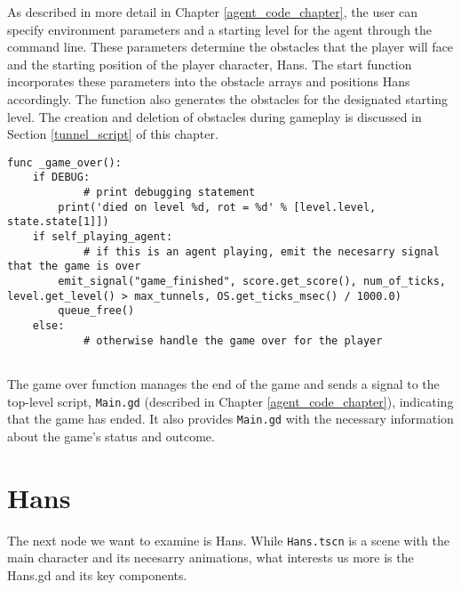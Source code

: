 As described in more detail in Chapter \ref{agent_code_chapter}, the user can specify environment parameters and a starting level for the agent through the command line. These parameters determine the obstacles that the player will face and the starting position of the player character, Hans. The start function incorporates these parameters into the obstacle arrays and positions Hans accordingly. The function also generates the obstacles for the designated starting level. The creation and deletion of obstacles during gameplay is discussed in Section \ref{tunnel_script} of this chapter.

\begin{lstlisting} 
func _game_over():
    if DEBUG:
    		# print debugging statement
        print('died on level %d, rot = %d' % [level.level, state.state[1]])
    if self_playing_agent:
    		# if this is an agent playing, emit the necesarry signal that the game is over
        emit_signal("game_finished", score.get_score(), num_of_ticks, level.get_level() > max_tunnels, OS.get_ticks_msec() / 1000.0) 
        queue_free()
    else:
    		# otherwise handle the game over for the player
        
\end{lstlisting}

The game over function manages the end of the game and sends a signal to the top-level script, \texttt{Main.gd} (described in Chapter \ref{agent_code_chapter}), indicating that the game has ended. It also provides \texttt{Main.gd} with the necessary information about the game's status and outcome.

\section{Hans}
The next node we want to examine is Hans. While \texttt{Hans.tscn} is a scene with the main character and its necesarry animations, what interests us more is the Hans.gd and its key components.

